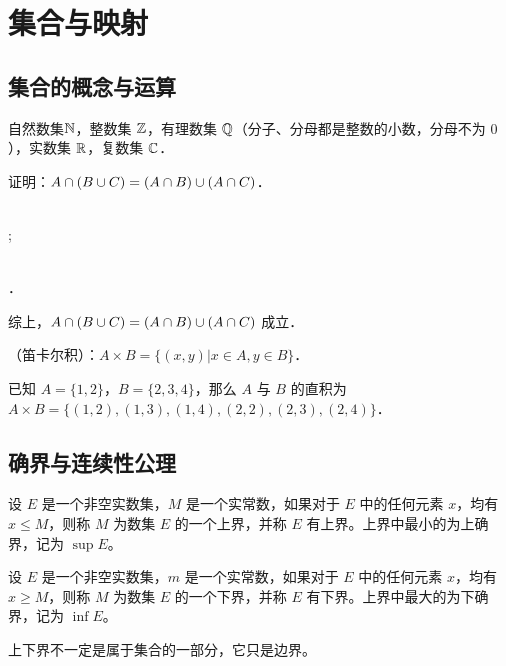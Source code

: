 \documentclass[shortmath]{AirNote}
\begin{document}
\section{集合与映射}
\subsection{集合的概念与运算}
自然数集$\mathbb{N}$，整数集 $\mathbb{Z}$，有理数集 $ \mathbb{Q} $（分子、分母都是整数的小数，分母不为 $ 0 $），实数集 $ \mathbb{R} $，复数集 $ \mathbb{C} $．

\begin{liti}
证明：$ A \cap (B \cup C) = (A \cap B)\cup(A \cap C)$．

\Ra{}\Ra{}\Ra{}\\
\Ra{}\Ra{};

\Ra{}\Ra{}\\
\Ra{}\Ra{}\Ra{}\Ra{}．

综上，$ A \cap (B \cup C) = (A \cap B)\cup(A \cap C) $ 成立．
\end{liti}

\fm {}（笛卡尔积）：$ A \times B = \{(x,y)|x \in A, y \in B\} $．

已知 $ A = \{1,2\} $，$ B = \{2,3,4\} $，那么 $ A $ 与 $ B $ 的直积为 $ A \times B = \{(1,2),(1,3),(1,4),(2,2),(2,3),(2,4)\} $．

\subsection{确界与连续性公理}
 设 $ E $ 是一个非空实数集，$ M $ 是一个实常数，如果对于 $ E $ 中的任何元素 $ x $，均有 $ x \le M $，则称 $ M $ 为数集 $ E $ 的一个上界，并称 $ E $ 有上界。上界中最小的为上确界，记为 $ \sup E $。


 设 $ E $ 是一个非空实数集，$ m $ 是一个实常数，如果对于 $ E $ 中的任何元素 $ x $，均有 $ x \ge M $，则称 $ M $ 为数集 $ E $ 的一个下界，并称 $ E $ 有下界。上界中最大的为下确界，记为 $ \inf E $。

\begin{vuyi}
上下界不一定是属于集合的一部分，它只是边界。
\end{vuyi}
\end{document}
